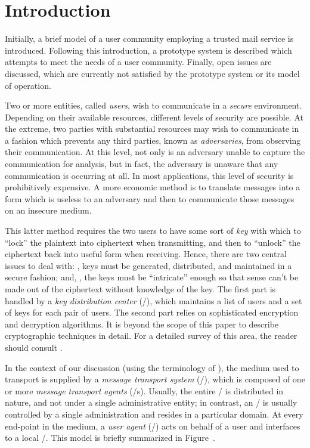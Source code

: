 
\banner

\section{Introduction}
Initially,
a brief model of a user community employing a trusted mail service is
introduced.
Following this introduction,
a prototype system is described which attempts to meet the needs of a user
community.
Finally,
open issues are discussed,
which are currently not satisfied by the prototype system or its model of
operation.

Two or more entities,
called {\it users},
wish to communicate in a {\it secure} environment.
Depending on their available resources,
different levels of security are possible.
At the extreme,
two parties with substantial resources may wish to communicate in a fashion
which prevents any third parties,
known as {\it adversaries},
from observing their communication.
At this level,
not only is an adversary unable to capture the communication for analysis,
but in fact, the adversary is unaware that any communication is occurring at
all.
In most applications,
this level of security is prohibitively expensive.
A more economic method is to translate messages into a form which is useless
to an adversary and then to communicate those messages on an insecure medium.

This latter method requires the two users to have some sort of {\it key}
with which to ``lock'' the plaintext into ciphertext when transmitting,
and then to ``unlock'' the ciphertext back into useful form when receiving.
Hence, there are two central issues to deal with:
,
keys must be generated, distributed, and maintained in a secure fashion;
and,
,
the keys must be ``intricate'' enough so that sense can't be made out of the
ciphertext without knowledge of the key.
The first part is handled by a {\it key distribution center} (\KDC/),
which maintains a list of users and a set of keys for each pair of users.
The second part relies on sophisticated encryption and decryption algorithms.
It is beyond the scope of this paper to describe cryptographic techniques in
detail.
For a detailed survey of this area, the reader should consult \cite{VVoyd83}.

In the context of our discussion (using the terminology of \cite{X.400}),
the medium used to transport is supplied
by a {\it message transport system} (\MTS/),
which is composed of one or more {\it message transport agents} (\MTA/s).
Usually,
the entire \MTS/ is distributed in nature,
and not under a single administrative entity;
in contrast, an \MTA/ is usually controlled by a single administration and
resides in a particular domain.
At every end-point in the medium,
a {\it user agent} (\UA/) acts on behalf of a user and interfaces
to a local \MTA/.
This model is briefly summarized in Figure~\mtsmodel.

